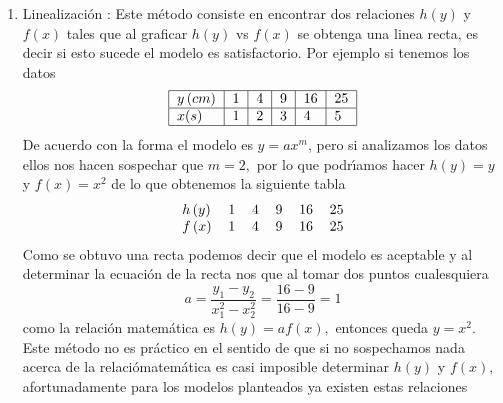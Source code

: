 \documentclass{article}
\begin{document}
\begin{enumerate}
\item Linealizaci\'{o}n :\newline
Este m\'{e}todo consiste en encontrar dos relaciones $h\left( y\right) $ y $%
f\left( x\right) $ tales que al graficar $h\left( y\right) $ vs $f\left(
x\right) $ se obtenga una linea recta, es decir si esto sucede el modelo es
satisfactorio.\newline
Por ejemplo si tenemos los datos 
\begin{equation*}
\begin{tabular}{|l|l|l|l|l|l|}
\hline
$y\left( cm\right) $ & 1 & 4 & 9 & 16 & 25 \\ \hline
$x(s)$ & 1 & 2 & 3 & 4 & 5 \\ \hline
\end{tabular}%
\end{equation*}
De acuerdo con la forma el
modelo es $y=ax^{m}$, pero si analizamos los datos ellos nos hacen sospechar
que $m=2,$ por lo que podr\'{\i}amos hacer $h\left( y\right) =y$ y $f\left(
x\right) =x^{2}$ de lo que obtenemos la siguiente tabla 
\begin{equation*}
\begin{tabular}{llllll}
$h\left( y\right) $ & 1 & 4 & 9 & 16 & 25 \\ 
$f\left( x\right) $ & 1 & 4 & 9 & 16 & 25%
\end{tabular}%
\end{equation*}
Como se obtuvo una recta
podemos decir que el modelo es aceptable y al determinar la ecuaci\'{o}n de
la recta nos que al tomar dos puntos cualesquiera 
\begin{equation*}
a=\frac{y_{1}-y_{2}}{x_{1}^{2}-x_{2}^{2}}=\frac{16-9}{16-9}=1
\end{equation*}
como la relaci\'{o}n matem\'{a}tica es $h\left( y\right) =af\left( x\right)
, $ entonces queda $y=x^{2}.$\newline
Este m\'{e}todo no es pr\'{a}ctico en el sentido de que si no sospechamos
nada acerca de la relaci\'{o}matem\'{a}tica es casi imposible determinar $%
h\left( y\right) $ y $f\left( x\right) ,$ afortunadamente para los modelos
planteados ya existen estas relaciones


\end{enumerate}
\end{document}
